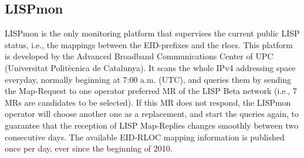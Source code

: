 \subsection{LISPmon}
\label{subsec:monitor_LISPmon}

LISPmon is the only monitoring platform that supervises the current public LISP status, i.e., the mappings between the EID-prefixes and the \acrshort{rloc}s. This platform is developed by the Advanced Broadband Communications Center of UPC (Universitat Politècnica de Catalunya). It scans the whole IPv4 addressing space everyday, normally beginning at 7:00 a.m. (UTC), and queries them by sending the Map-Request to one operator preferred MR of the LISP Beta network (i.e., 7 MRs are candidates to be selected). If this MR does not respond, the LISPmon operator will choose another one as a replacement, and start the queries again, to guarantee that the reception of LISP Map-Replies changes smoothly %
between two consecutive days. The available EID-RLOC mapping information is published once per day, ever since the beginning of 2010.

